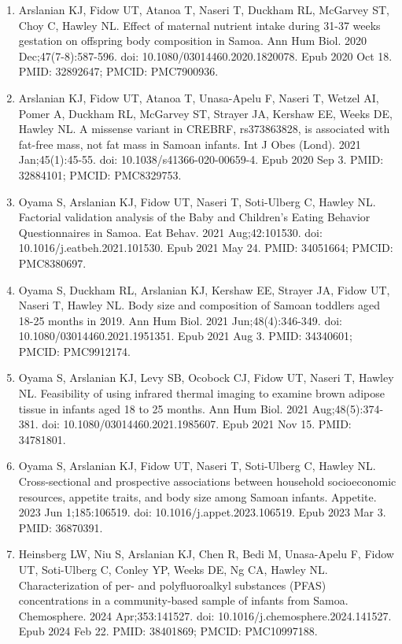 \documentclass[
  letterpaper,
  DIV=11,
  numbers=noendperiod]{scrreprt}
\begin{document}
\begin{enumerate}
\def\labelenumi{\arabic{enumi}.}
\item
  Arslanian KJ, Fidow UT, Atanoa T, Naseri T, Duckham RL, McGarvey ST,
  Choy C, Hawley NL. Effect of maternal nutrient intake during 31-37
  weeks gestation on offspring body composition in Samoa. Ann Hum Biol.
  2020 Dec;47(7-8):587-596. doi: 10.1080/03014460.2020.1820078. Epub
  2020 Oct 18. PMID: 32892647; PMCID: PMC7900936.
\item
  Arslanian KJ, Fidow UT, Atanoa T, Unasa-Apelu F, Naseri T, Wetzel AI,
  Pomer A, Duckham RL, McGarvey ST, Strayer JA, Kershaw EE, Weeks DE,
  Hawley NL. A missense variant in CREBRF, rs373863828, is associated
  with fat-free mass, not fat mass in Samoan infants. Int J Obes (Lond).
  2021 Jan;45(1):45-55. doi: 10.1038/s41366-020-00659-4. Epub 2020 Sep
  3. PMID: 32884101; PMCID: PMC8329753.
\item
  Oyama S, Arslanian KJ, Fidow UT, Naseri T, Soti-Ulberg C, Hawley NL.
  Factorial validation analysis of the Baby and Children's Eating
  Behavior Questionnaires in Samoa. Eat Behav. 2021 Aug;42:101530. doi:
  10.1016/j.eatbeh.2021.101530. Epub 2021 May 24. PMID: 34051664; PMCID:
  PMC8380697.
\item
  Oyama S, Duckham RL, Arslanian KJ, Kershaw EE, Strayer JA, Fidow UT,
  Naseri T, Hawley NL. Body size and composition of Samoan toddlers aged
  18-25 months in 2019. Ann Hum Biol. 2021 Jun;48(4):346-349. doi:
  10.1080/03014460.2021.1951351. Epub 2021 Aug 3. PMID: 34340601; PMCID:
  PMC9912174.
\item
  Oyama S, Arslanian KJ, Levy SB, Ocobock CJ, Fidow UT, Naseri T, Hawley
  NL. Feasibility of using infrared thermal imaging to examine brown
  adipose tissue in infants aged 18 to 25 months. Ann Hum Biol. 2021
  Aug;48(5):374-381. doi: 10.1080/03014460.2021.1985607. Epub 2021 Nov
  15. PMID: 34781801.
\item
  Oyama S, Arslanian KJ, Fidow UT, Naseri T, Soti-Ulberg C, Hawley NL.
  Cross-sectional and prospective associations between household
  socioeconomic resources, appetite traits, and body size among Samoan
  infants. Appetite. 2023 Jun 1;185:106519. doi:
  10.1016/j.appet.2023.106519. Epub 2023 Mar 3. PMID: 36870391.
\item
  Heinsberg LW, Niu S, Arslanian KJ, Chen R, Bedi M, Unasa-Apelu F,
  Fidow UT, Soti-Ulberg C, Conley YP, Weeks DE, Ng CA, Hawley NL.
  Characterization of per- and polyfluoroalkyl substances (PFAS)
  concentrations in a community-based sample of infants from Samoa.
  Chemosphere. 2024 Apr;353:141527. doi:
  10.1016/j.chemosphere.2024.141527. Epub 2024 Feb 22. PMID: 38401869;
  PMCID: PMC10997188.
\end{enumerate}
\end{document}
